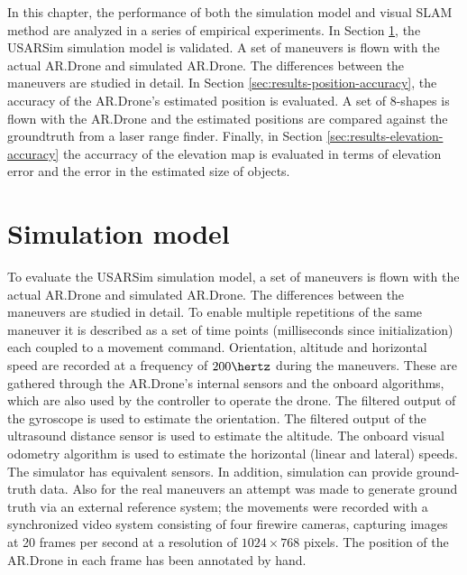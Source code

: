 In this chapter, the performance of both the simulation model and visual SLAM method are analyzed in a series of empirical experiments.
In Section \ref{sec:simulation_results}, the USARSim simulation model is validated.
A set of maneuvers is flown with the actual AR.Drone and
simulated AR.Drone. The differences between the maneuvers are studied in detail.
In Section \ref{sec:results-position-accuracy}, the accuracy of the AR.Drone's estimated position is evaluated.
A set of 8-shapes is flown with the AR.Drone and the estimated positions are compared against the groundtruth from a laser range finder.
Finally, in Section \ref{sec:results-elevation-accuracy} the accurracy of the elevation map is evaluated in terms of elevation error and the error in the estimated size of objects.


	\section{Simulation model}
\label{sec:simulation_results}
To evaluate the USARSim simulation model,  
a set of maneuvers is flown with the actual AR.Drone and
simulated AR.Drone. The differences between the maneuvers are studied in detail. To enable multiple repetitions of the same maneuver it is
described as a set of time points (milliseconds since initialization) each coupled to a movement command.
Orientation, altitude and horizontal speed are recorded at a frequency of $200\hertz$ during the maneuvers. These are gathered through the AR.Drone's internal sensors and the onboard algorithms, which are
also used by the controller to operate the drone. The filtered output of the gyroscope is used
to estimate the orientation. The filtered output of the ultrasound distance sensor is used to estimate
the altitude. The onboard visual odometry algorithm is used to estimate the horizontal (linear
and lateral) speeds. The simulator has equivalent sensors. In addition, simulation can provide ground-truth data. 
Also for the real maneuvers an attempt was made to generate ground truth via an external reference system; the movements were recorded with a synchronized video system consisting of four firewire cameras, capturing images at 20 frames per second at a resolution of $1024 \times 768$ pixels. The position of the AR.Drone 
in each frame has been annotated by hand. 

